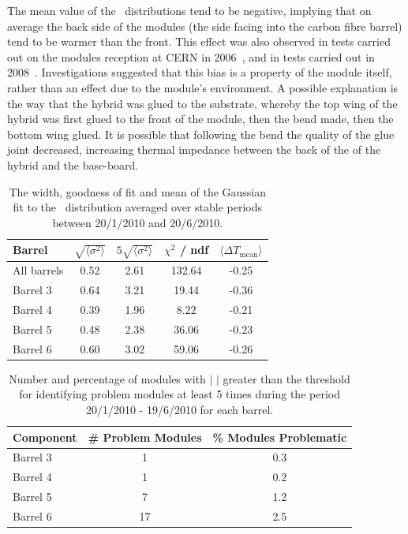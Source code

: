 The mean value of the \deltat\ distributions tend to be negative, implying that
on average the back side of the modules (the side facing into the carbon fibre
barrel) tend to be warmer than the front. This effect was also observed in tests
carried out on the modules reception at CERN in 2006~\cite{Viehhauser:2006ix},
and in tests carried out in 2008~\cite{Shaw:1229428}. Investigations suggested
that this bias is a property of the module itself, rather than an effect due to
the module's environment. A possible explanation is the way that the hybrid was
glued to the substrate, whereby the top wing of the hybrid was first glued to the front of the
module, then the bend made, then the bottom wing glued. It is possible that
following the bend the quality of the glue joint decreased, increasing thermal
impedance between the back of the of the hybrid and the base-board.

\begin{table}
\centering
\begin{tabular}{ l | c  c  c  c }
\hline\hline
Barrel & $\sqrt{\langle \sigma ^ 2 \rangle }$ & $5\sqrt{\langle \sigma ^ 2 \rangle }$ & $\chi ^2 $  / ndf & $\langle \Delta T_{\mathrm{mean}} \rangle$ \\
\hline
All barrels & 0.52 & 2.61 & 132.64 & -0.25\\
Barrel 3 & 0.64 & 3.21 & 19.44 & -0.36 \\
Barrel 4 & 0.39 & 1.96 & 8.22 & -0.21 \\
Barrel 5 & 0.48 & 2.38 & 36.06 & -0.23 \\
Barrel 6 & 0.60 & 3.02 & 59.06 & -0.26 \\
\hline\hline
\end{tabular}
 \caption{The width, goodness of fit and mean of the Gaussian fit to the
 \deltat\ distribution averaged over stable periods between 20/1/2010 and 20/6/2010.}
	\label{table:dt_thresh}

\end{table}

\begin{table}
\centering
 \begin{tabular}{  l | c  c }
\hline\hline
Component & \# Problem Modules & \% Modules Problematic \\
\hline
Barrel 3 & 1 & 0.3 \\
Barrel 4 & 1 & 0.2 \\
Barrel 5 & 7 & 1.2 \\
Barrel 6 & 17 & 2.5 \\
\hline\hline
\end{tabular}
\caption{Number and percentage of modules with $|$ \deltat$|$ greater than the
threshold for identifying problem modules at least 5 times during the period
20/1/2010 - 19/6/2010 for each barrel.}
\label{table:dt_num}
\end{table}


